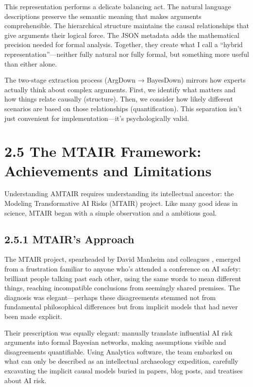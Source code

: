 \documentclass[
  11pt,
  letterpaper,
]{book}
\begin{document}
This representation performs a delicate balancing act. The natural
language descriptions preserve the semantic meaning that makes arguments
comprehensible. The hierarchical structure maintains the causal
relationships that give arguments their logical force. The JSON metadata
adds the mathematical precision needed for formal analysis. Together,
they create what I call a ``hybrid representation''---neither fully
natural nor fully formal, but something more useful than either alone.

The two-stage extraction process (ArgDown → BayesDown) mirrors how
experts actually think about complex arguments. First, we identify what
matters and how things relate causally (structure). Then, we consider
how likely different scenarios are based on those relationships
(quantification). This separation isn't just convenient for
implementation---it's psychologically valid.

\section{2.5 The MTAIR Framework: Achievements and
Limitations}\label{sec-mtair-framework}

Understanding AMTAIR requires understanding its intellectual ancestor:
the Modeling Transformative AI Risks (MTAIR) project. Like many good
ideas in science, MTAIR began with a simple observation and a ambitious
goal.

\subsection{2.5.1 MTAIR's Approach}\label{sec-mtair-approach}

The MTAIR project, spearheaded by David Manheim and colleagues
\textcite{clarke2022}, emerged from a frustration familiar to anyone
who's attended a conference on AI safety: brilliant people talking past
each other, using the same words to mean different things, reaching
incompatible conclusions from seemingly shared premises. The diagnosis
was elegant---perhaps these disagreements stemmed not from fundamental
philosophical differences but from implicit models that had never been
made explicit.

Their prescription was equally elegant: manually translate influential
AI risk arguments into formal Bayesian networks, making assumptions
visible and disagreements quantifiable. Using Analytica software, the
team embarked on what can only be described as an intellectual
archaeology expedition, carefully excavating the implicit causal models
buried in papers, blog posts, and treatises about AI risk.
\end{document}
